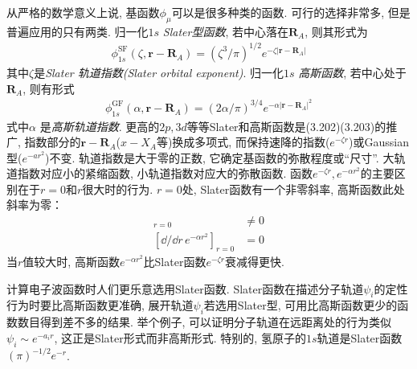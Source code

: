 从严格的数学意义上说, 基函数$\phi_\mu$可以是很多种类的函数. 可行的选择非常多, 但是普遍应用的只有两类. 归一化$1s$ \emph{Slater型函数}, 若中心落在$\mathbf{R}_A$, 则其形式为
\begin{align}
\phi_{1s}^\mathrm{SF}(\zeta,\mathbf{r-R}_A) = (\zeta^3/\pi)^{1/2}e^{-\zeta|\mathbf{r-R}_A|}
\end{align}
其中$\zeta$是\emph{Slater 轨道指数(Slater orbital exponent)}. 归一化$1s$ \emph{高斯函数}, 若中心处于$\mathbf{R}_A$, 则有形式
\begin{align}
\phi_{1s}^\mathrm{GF}(\alpha,\mathbf{r-R}_A) = (2\alpha/\pi)^{3/4}e^{-\alpha|\mathbf{r-R}_A|^2}
\end{align}
式中$\alpha$ 是\emph{高斯轨道指数}. 更高的$2p,3d$等等Slater和高斯函数是(3.202)(3.203)的推广, 指数部分的$\mathbf{r-R}_A$($x-X_A$等)换成多项式, 而保持速降的指数($e^{-\zeta r}$)或Gaussian型($e^{-ar^2}$)不变. 轨道指数是大于零的正数, 它确定基函数的弥散程度或``尺寸''. 大轨道指数对应小的紧缩函数, 小轨道指数对应大的弥散函数. 函数$e^{-\zeta r},e^{-\alpha r^2}$的主要区别在于$r=0$和$r$很大时的行为. $r=0$处, Slater函数有一个非零斜率, 高斯函数此处斜率为零：
\begin{align}
[\dd/\dd r\, e^{-\zeta r}]_{r=0}& \neq 0\\
[\dd/\dd r\, e^{-\alpha r^2}]_{r=0}&  =   0
\end{align}
当$r$值较大时, 高斯函数$e^{-\alpha r^2}$比Slater函数$e^{-\zeta r}$衰减得更快.

计算电子波函数时人们更乐意选用Slater函数. Slater函数在描述分子轨道$\psi_i$的定性行为时要比高斯函数更准确, 展开轨道$\psi_i$若选用Slater型, 可用比高斯函数更少的函数数目得到差不多的结果. 举个例子, 可以证明分子轨道在远距离处的行为类似$\psi_i\sim e^{-a_ir}$, 这正是Slater形式而非高斯形式. 特别的, 氢原子的$1s$轨道是Slater函数$(\pi)^{-1/2}e^{-r}$.

